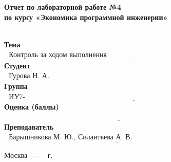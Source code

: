 \begin{titlepage}
	
	\begin{center}
		\Large\textbf{Отчет по лабораторной работе №4}\\
		\Large\textbf{по курсу «Экономика программной инженерии»}\\
		~\\
	\end{center}
	
	\noindent\textbf{Тема} $\underline{\text{~~Контроль за ходом выполнения проекта~~~~~~~~~~~~~~~~~~~~~~~~~~~~~~~~~~~~~~~~~~~~~~~~~~~~~~~~~~~~~~~}}$\newline\newline
	\noindent\textbf{Студент} $\underline{\text{~~Гурова Н. А.~~~~~~~~~~~~~~~~~~~~~~~~~~~~~~~~~~~~~~~~~~~~~~~~~~~~~~~~~~~~~~~~~~~~~~~~~~~~~~~~~~~~~~~~}}$\newline\newline
	\noindent\textbf{Группа} $\underline{\text{~~ИУ7-84Б~~~~~~~~~~~~~~~~~~~~~~~~~~~~~~~~~~~~~~~~~~~~~~~~~~~~~~~~~~~~~~~~~~~~~~~~~~~~~~~~~~~~~~~~~~~~~~~}}$\newline\newline
	\noindent\textbf{Оценка (баллы)} $\underline{\text{ ~~~~~~~~~~~~~~~~~~~~~~~~~~~~~~~~~~~~~~~~~~~~~~~~~~~~~~~~~~~~~~~~~~~~~~~~~~~~~~~~~~~~~~~~~~~~~~~}}$\newline\newline
	\noindent\textbf{Преподаватель} $\underline{\text{~~Барышникова М. Ю., Силантьева А. В.~~~~~~~~~~~~~~~~~~~~~~~~~~~~~~~~~~~~~~~~~}}$\newline
	
	\begin{center}
		\vfill
		Москва~---~\the\year
		~г.
	\end{center}
	\restoregeometry
\end{titlepage}

